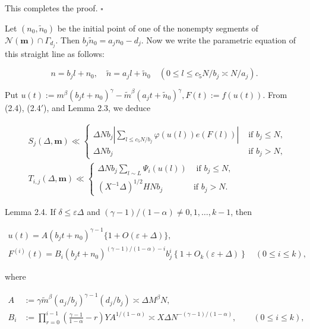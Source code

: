 \documentclass[10pt]{article}
\begin{document}
This completes the proof. \(\square\)

Let $(n_0,\tilde n_0)$ be the initial point of one of the nonempty segments of $\mathscr N(\mathbf m)\cap\Gamma_{d_j}$. Then $b_{j} \tilde{n}_{0}=a_{j} n_{0}-d_{j}$. Now we write the parametric equation of this straight line as follows:

$$
n=b_{j} l+n_{0}, \quad \tilde{n}=a_{j} l+\tilde{n}_{0} \quad\left(0 \leqslant l \leqslant c_{5} N / b_{j} \asymp N / a_{j}\right) .
$$

Put $u(t):=m^{\beta}\left(b_{j} t+n_{0}\right)^{\gamma}-\tilde{m}^{\beta}\left(a_{j} t+\tilde{n}_{0}\right)^{\gamma}, F(t):=f(u(t))$. From (2.4), (2.4$'$), and Lemma 2.3, we deduce


\begin{align*}
& S_{j}(\Delta, \mathbf{m}) \ll \begin{cases}\Delta N b_{j}\left|\sum_{l \leqslant c_{5} N / b_{j}} \varphi(u(l)) e(F(l))\right| & \text { if } b_{j} \leqslant N, \\
\Delta N b_{j} & \text { if } b_{j}>N,\end{cases}  \tag{2.5}\\
& T_{i, j}(\Delta, \mathbf{m}) \ll \begin{cases}\Delta N b_{j} \sum_{l \sim L} \Psi_{i}(u(l)) & \text { if } b_{j} \leqslant N, \\
\left(X^{-1}\Delta\right)^{1/2}HNb_j & \text{if } b_j>N.\end{cases}\tag{2.5$'$}
\end{align*}


Lemma 2.4. If $\delta \leqslant \varepsilon \Delta$ and $(\gamma-1) /(1-\alpha) \neq 0,1, \ldots, k-1$, then


\begin{gather*}
u(t)=A\left(b_{j} t+n_{0}\right)^{\gamma-1}\{1+O(\varepsilon+\Delta)\},  \tag{2.6}\\
F^{(i)}(t)=B_i\left(b_jt+n_0\right)^{(\gamma-1)/(1-\alpha)-i}b_j^i\left\{1+O_k(\varepsilon+\Delta)\right\}\quad(0\leqslant i\leqslant k), \tag{2.7}
\end{gather*}


where

$$
\begin{aligned}
A & :=\gamma \tilde{m}^{\beta}\left(a_{j} / b_{j}\right)^{\gamma-1}\left(d_{j} / b_{j}\right) \asymp \Delta M^{\beta} N, \\
B_i & :=\prod_{r=0}^{i-1}\left(\frac{\gamma-1}{1-\alpha}-r\right)YA^{1/(1-\alpha)}\asymp X\Delta N^{-(\gamma-1)/(1-\alpha)},\qquad (0\leqslant i\leqslant k),
\end{aligned}
$$
\end{document}
